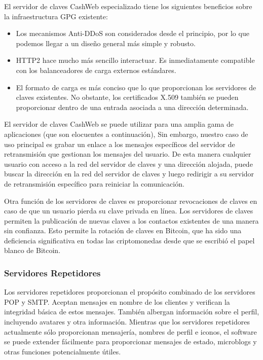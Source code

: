 \documentclass{article}
\begin{document}
El servidor de claves CashWeb especializado tiene los siguientes beneficios sobre la infraestructura GPG existente:
\begin{itemize}
  \item Los mecanismos Anti-DDoS son considerados desde el principio, por lo que podemos llegar a un diseño general más simple y robusto.
  \item HTTP2 hace mucho más sencillo interactuar. Es inmediatamente compatible con los balanceadores de carga externos estándares.
  \item El formato de carga es más conciso que lo que proporcionan los servidores de claves existentes. No obstante, los certificados X.509 también se pueden proporcionar dentro de una entrada asociada a una dirección determinada.
\end{itemize}

El servidor de claves CashWeb se puede utilizar para una amplia gama de aplicaciones (que son elocuentes a continuación), Sin embargo, nuestro caso de uso principal es grabar un enlace a los mensajes específicos del servidor de retransmisión que gestionan los mensajes del usuario. De esta manera cualquier usuario con acceso a la red del servidor de claves y una dirección alojada, puede buscar la dirección en la red del servidor de claves y luego redirigir a su servidor de retransmisión específico para reiniciar la comunicación. 

Otra función de los servidores de claves es proporcionar revocaciones de claves en caso de que un usuario pierda su clave privada en línea. Los servidores de claves permiten la publicación de nuevas claves a los contactos existentes de una manera sin confianza. Esto permite la rotación de claves en Bitcoin, que ha sido una deficiencia significativa en todas las criptomonedas desde que se escribió el papel blanco de Bitcoin.

\subsubsection{Servidores Repetidores}

Los servidores repetidores proporcionan el propósito combinado de los servidores POP y SMTP. Aceptan mensajes en nombre de los clientes y verifican la integridad básica de estos mensajes. También albergan información sobre el perfil, incluyendo avatares y otra información. Mientras que los servidores repetidores actualmente sólo proporcionan mensajería, nombres de perfil e iconos, el software se puede extender fácilmente para proporcionar mensajes de estado, microblogs y otras funciones potencialmente útiles.
\end{document}
